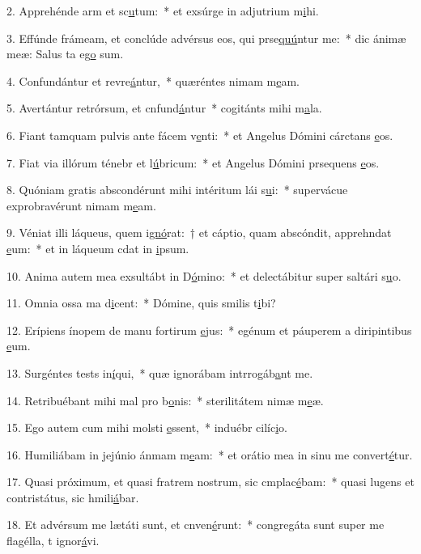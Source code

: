2. Apprehénde arm et sc\uline{u}tum:~* et exsúrge in adjutrium m\uline{i}hi.\par 
3. Effúnde frámeam, et conclúde advérsus eos, qui prse\uline{quú}ntur me:~* dic ánimæ meæ: Salus ta eg\uline{o} sum.\par 
4. Confundántur et revre\uline{á}ntur,~* quæréntes nimam m\uline{e}am.\par 
5. Avertántur retrórsum, et cnfund\uline{á}ntur~* cogitánts mihi m\uline{a}la.\par 
6. Fiant tamquam pulvis ante fácem v\uline{e}nti:~* et Angelus Dómini cárctans \uline{e}os.\par 
7. Fiat via illórum ténebr et l\uline{ú}bricum:~* et Angelus Dómini prsequens \uline{e}os.\par 
8. Quóniam gratis abscondérunt mihi intéritum lái s\uline{u}i:~* supervácue exprobravérunt nimam m\uline{e}am.\par 
9. Véniat illi láqueus, quem i\uline{gnó}rat:~† et cáptio, quam abscóndit, apprehndat \uline{e}um:~* et in láqueum cdat in \uline{i}psum.\par 
10. Anima autem mea exsultábt in D\uline{ó}mino:~* et delectábitur super saltári s\uline{u}o.\par 
11. Omnia ossa ma d\uline{i}cent:~* Dómine, quis smilis t\uline{i}bi?\par 
12. Erípiens ínopem de manu fortirum \uline{e}jus:~* egénum et páuperem a diripintibus \uline{e}um.\par 
13. Surgéntes tests in\uline{í}qui,~* quæ ignorábam intrrogáb\uline{a}nt me.\par 
14. Retribuébant mihi mal pro b\uline{o}nis:~* sterilitátem nimæ m\uline{e}æ.\par 
15. Ego autem cum mihi molsti \uline{e}ssent,~* induébr cilíc\uline{i}o.\par 
16. Humiliábam in jejúnio ánmam m\uline{e}am:~* et orátio mea in sinu me convert\uline{é}tur.\par 
17. Quasi próximum, et quasi fratrem nostrum, sic cmplac\uline{é}bam:~* quasi lugens et contristátus, sic hmili\uline{á}bar.\par 
18. Et advérsum me lætáti sunt, et cnven\uline{é}runt:~* congregáta sunt super me flagélla, t ignor\uline{á}vi.\par 
